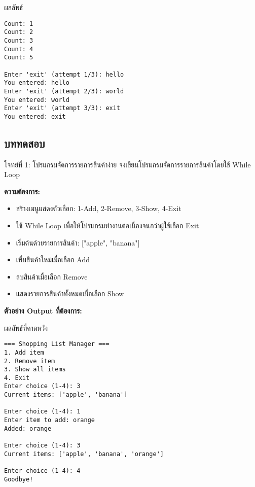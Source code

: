 \documentclass[12pt,a4paper]{article}
\newcommand{\textlight}[1]{{\thailightfont #1}}
\begin{document}
\begin{resultbox}{ผลลัพธ์}
\begin{verbatim}
Count: 1
Count: 2
Count: 3
Count: 4
Count: 5

Enter 'exit' (attempt 1/3): hello
You entered: hello
Enter 'exit' (attempt 2/3): world
You entered: world
Enter 'exit' (attempt 3/3): exit
You entered: exit
\end{verbatim}
\end{resultbox}

\vspace{6cm}

\subsection{บททดสอบ}

\begin{exercisebox}{โจทย์ที่ 1: โปรแกรมจัดการรายการสินค้าง่าย}
\textlight{จงเขียนโปรแกรมจัดการรายการสินค้าโดยใช้ While Loop}

\textlight{\textbf{ความต้องการ:}}
\begin{itemize}
    \item \textlight{สร้างเมนูแสดงตัวเลือก: 1-Add, 2-Remove, 3-Show, 4-Exit}
    \item \textlight{ใช้ While Loop เพื่อให้โปรแกรมทำงานต่อเนื่องจนกว่าผู้ใช้เลือก Exit}
    \item \textlight{เริ่มต้นด้วยรายการสินค้า: ["apple", "banana"]}
    \item \textlight{เพิ่มสินค้าใหม่เมื่อเลือก Add}
    \item \textlight{ลบสินค้าเมื่อเลือก Remove}
    \item \textlight{แสดงรายการสินค้าทั้งหมดเมื่อเลือก Show}
\end{itemize}

\textlight{\textbf{ตัวอย่าง Output ที่ต้องการ:}}
\begin{codebox}{ผลลัพธ์ที่คาดหวัง}
\begin{lstlisting}[style=python]
=== Shopping List Manager ===
1. Add item
2. Remove item  
3. Show all items
4. Exit
Enter choice (1-4): 3
Current items: ['apple', 'banana']

Enter choice (1-4): 1
Enter item to add: orange
Added: orange

Enter choice (1-4): 3
Current items: ['apple', 'banana', 'orange']

Enter choice (1-4): 4
Goodbye!
\end{lstlisting}
\end{codebox}

\end{exercisebox}
\end{document}
